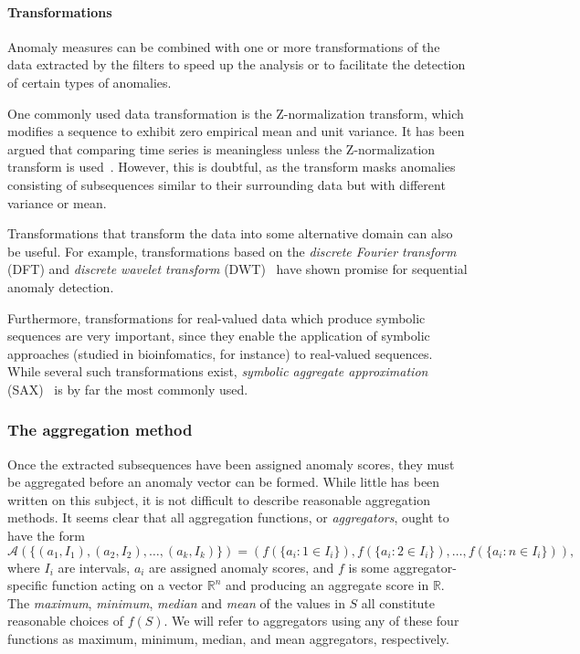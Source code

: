 \paragraph{Transformations}
Anomaly measures can be combined with one or more transformations of the data extracted by the filters to speed up the analysis or to facilitate the detection of certain types of anomalies.

One commonly used data transformation is the Z-normalization transform, which modifies a sequence to exhibit zero empirical mean and unit variance. It has been argued that comparing time series is meaningless unless the Z-normalization transform is used~\cite{keogh5}. However, this is doubtful, as the transform masks anomalies consisting of subsequences similar to their surrounding data but with different variance or mean.

Transformations that transform the data into some alternative domain can also be useful. For example, transformations based on the \emph{discrete Fourier transform} (DFT) and \emph{discrete wavelet transform} (DWT)~\cite{fu} have shown promise for sequential anomaly detection.

Furthermore, transformations for real-valued data which produce symbolic sequences are very important, since they enable the application of symbolic approaches (studied in bioinfomatics, for instance) to real-valued sequences. While several such transformations exist, \emph{symbolic aggregate approximation} (SAX)~\cite{sax} is by far the most commonly used.

\subsubsection{The aggregation method}
\label{sect:aggregation_method}

Once the extracted subsequences have been assigned anomaly scores, they must be aggregated before an anomaly vector can be formed. While little has been written on this subject, it is not difficult to describe reasonable aggregation methods. It seems clear that all aggregation functions, or \emph{aggregators}, ought to have the form
\[
    \mathcal{A}(\{(a_1, I_1), (a_2, I_2), \dots, (a_k, I_k) \}) = (f(\{a_i: 1 \in I_i\}), f(\{a_i: 2 \in I_i\}), \dots, f(\{a_i: n \in I_i\})),
\]
where $I_i$ are intervals, $a_i$ are assigned anomaly scores, and $f$ is some aggregator-specific function acting on a vector $\mathbb{R}^n$ and producing an aggregate score in $\mathbb{R}$. The \emph{maximum}, \emph{minimum}, \emph{median} and \emph{mean} of the values in $S$ all constitute reasonable choices of $f(S)$. We will refer to aggregators using any of these four functions as maximum, minimum, median, and mean aggregators, respectively.

